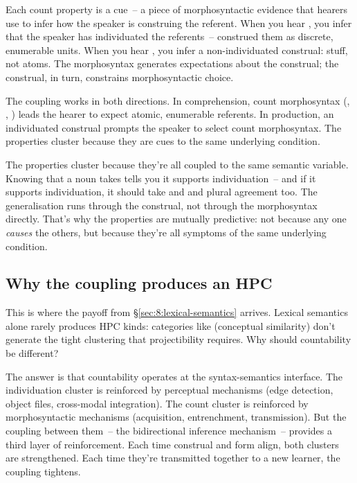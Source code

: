 Each count property is a cue~-- a piece of morphosyntactic evidence that hearers use to infer how the speaker is construing the referent. When you hear , you infer that the speaker has individuated the referents~-- construed them as discrete, enumerable units. When you hear , you infer a non-individuated construal: stuff, not atoms. The morphosyntax generates expectations about the construal; the construal, in turn, constrains morphosyntactic choice.

The coupling works in both directions. In comprehension, count morphosyntax (, , ) leads the hearer to expect atomic, enumerable referents. In production, an individuated construal prompts the speaker to select count morphosyntax. The properties cluster because they are cues to the same underlying condition.

The properties cluster because they're all coupled to the same semantic variable. Knowing that a noun takes  tells you it supports individuation~-- and if it supports individuation, it should take  and  and plural agreement too. The generalisation runs through the construal, not through the morphosyntax directly. That's why the properties are mutually predictive: not because any one \emph{causes} the others, but because they're all symptoms of the same underlying condition.

\subsection{Why the coupling produces an HPC}
\label{sec:9:coupling-hpc}

This is where the payoff from §\ref{sec:8:lexical-semantics} arrives. Lexical semantics alone rarely produces HPC kinds: categories like  (conceptual similarity) don't generate the tight clustering that projectibility requires. Why should countability be different?

The answer is that countability operates at the syntax-semantics interface. The individuation cluster is reinforced by perceptual mechanisms (edge detection, object files, cross-modal integration). The count cluster is reinforced by morphosyntactic mechanisms (acquisition, entrenchment, transmission). But the coupling between them~-- the bidirectional inference mechanism~-- provides a third layer of reinforcement. Each time construal and form align, both clusters are strengthened. Each time they're transmitted together to a new learner, the coupling tightens.

